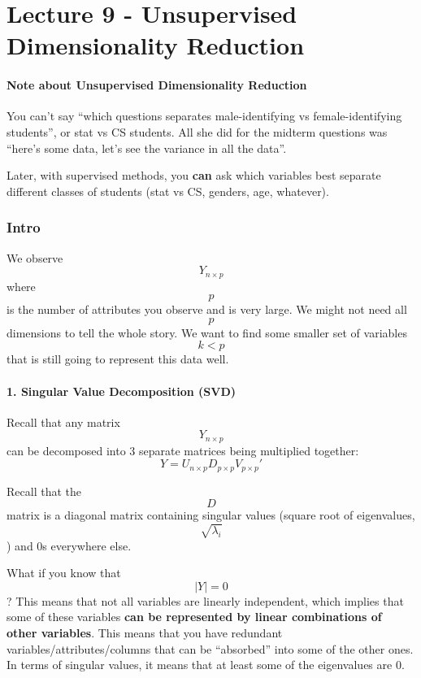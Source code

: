 \hypertarget{lecture-9---unsupervised-dimensionality-reduction}{%
\chapter{Lecture 9 - Unsupervised Dimensionality
Reduction}\label{lecture-9---unsupervised-dimensionality-reduction}}

\hypertarget{note-about-unsupervised-dimensionality-reduction}{%
\subsubsection{Note about Unsupervised Dimensionality
Reduction}\label{note-about-unsupervised-dimensionality-reduction}}

You can't say ``which questions separates male-identifying vs
female-identifying students'', or stat vs CS students. All she did for
the midterm questions was ``here's some data, let's see the variance in
all the data''.

Later, with supervised methods, you \textbf{can} ask which variables
best separate different classes of students (stat vs CS, genders, age,
whatever).

\hypertarget{intro}{%
\subsection{Intro}\label{intro}}

We observe \[Y_{n \times p}\] where \[p\] is the number of attributes
you observe and is very large. We might not need all \[p\] dimensions to
tell the whole story. We want to find some smaller set of variables
\[k < p\] that is still going to represent this data well.

\hypertarget{singular-value-decomposition-svd}{%
\subsubsection{1. Singular Value Decomposition
(SVD)}\label{singular-value-decomposition-svd}}

Recall that any matrix \[Y_{n \times p}\] can be decomposed into 3
separate matrices being multiplied together:
\[Y = U_{n \times p}D_{p \times p}V_{p \times p}'\]

Recall that the \[D\] matrix is a diagonal matrix containing singular
values (square root of eigenvalues, \[\sqrt{\lambda_i}\]) and 0s
everywhere else.

What if you know that \[|Y| = 0\]? This means that not all variables are
linearly independent, which implies that some of these variables
\textbf{can be represented by linear combinations of other variables}.
This means that you have redundant variables/attributes/columns that can
be ``absorbed'' into some of the other ones. In terms of singular
values, it means that at least some of the eigenvalues are 0.

